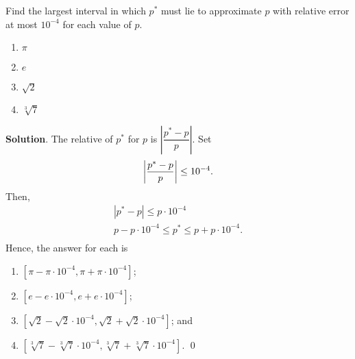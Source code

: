\documentclass[11pt]{article}
\theoremstyle{break}
\numberwithin{equation}{theorem}
\begin{document}
\newpage
\begin{problem}\label{problem 5}
    Find the largest interval in which $p^\ast$ must lie to approximate $p$ with relative error at most $10^{-4}$ for each value of $p$.
    \begin{enumerate}
        \item $\pi$
        \item $e$
        \item $\sqrt{2}$
        \item $\sqrt[3]{7}$
    \end{enumerate}
\end{problem}
\textbf{Solution}. The relative of $p^\ast$ for $p$ is $\left|\dfrac{p^{\ast}-p}{p}\right|$. Set \vspace{-0.6em}
\begin{equation*}
    \left|\dfrac{p^{\ast}-p}{p}\right|\leq 10^{-4}. \vspace{-0.6em}
\end{equation*}
Then, \vspace{-0.6em}
\begin{align*}
    \left|p^{\ast}-p\right|\leq p\cdot 10^{-4}\\
    p-p\cdot 10^{-4}\leq p^\ast\leq p+p\cdot 10^{-4}.\\[-3.4em]
\end{align*}
Hence, the answer for each is
\begin{enumerate}
    \item $\left[\pi-\pi\cdot10^{-4}, \pi+\pi\cdot10^{-4}\right]$;
    \item $\left[e-e\cdot10^{-4}, e+e\cdot10^{-4}\right]$;
    \item $\left[\sqrt{2}-\sqrt{2}\cdot10^{-4}, \sqrt{2}+\sqrt{2}\cdot10^{-4}\right]$; and
    \item $\left[\sqrt[3]{7}-\sqrt[3]{7}\cdot10^{-4}, \sqrt[3]{7}+\sqrt[3]{7}\cdot10^{-4}\right]$. \qed
\end{enumerate}
\end{document}
